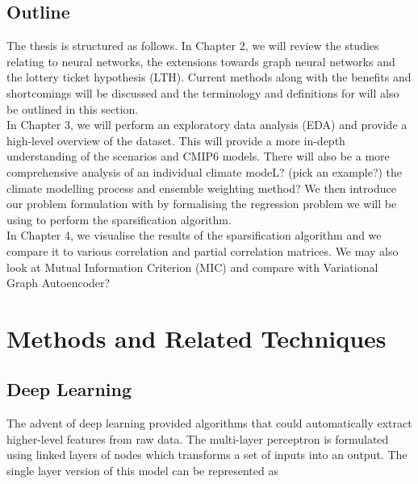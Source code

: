 \documentclass[honours,12pt]{unswthesis}
\numberwithin{equation}{section}
\begin{document}
{\section{Outline}}\label{outline}

{\noindent}The thesis is structured as follows. 
In Chapter 2, we will review the studies relating to neural networks, the extensions towards graph neural networks and the lottery ticket hypothesis (LTH).
Current methods along with the benefits and shortcomings will be discussed and the terminology and definitions for will also be outlined in this section. \\

{\noindent} In Chapter 3, we will perform an exploratory data analysis (EDA) and provide a high-level overview of the dataset. This will provide a more
in-depth understanding of the scenarios and CMIP6 models. There will also be a more comprehensive analysis of an individual climate modeL? (pick an example?)
the climate modelling process and ensemble weighting method? We then introduce our problem formulation with by formalising the regression problem we will be using
to perform the sparsification algorithm. \\

In Chapter 4, we visualise the results of the sparsification algorithm and we compare it to various correlation and partial correlation matrices. 
We may also look at Mutual Information Criterion (MIC) and compare with Variational Graph Autoencoder?



\chapter{Methods and Related Techniques}






\section{Deep Learning}\label{nn}
The advent of deep learning provided algorithms that could automatically extract higher-level features from raw data.\cite{deng-deep-learning}
The multi-layer perceptron\cite{rumelhart1986learning} is formulated using linked layers of nodes which transforms a set of inputs into an output.
The single layer version of this model can be represented as
\end{document}
